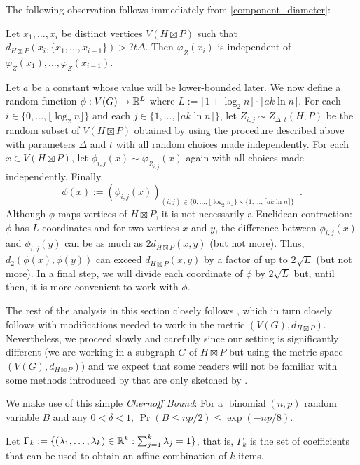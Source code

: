 \documentclass{patmorin}
\newcommand{\defin}[1]{\emph{\textcolor{brightmaroon}{#1}}}
\begin{document}
The following observation follows immediately from \cref{component_diameter}:
\begin{obs}\label{independent}
  Let $x_1,\ldots,x_i$ be distinct vertices $V(H\boxtimes P)$ such that $d_{H\boxtimes P}(x_i,\{x_1,\ldots,x_{i-1}\})> ?t\Delta$. Then $\varphi_Z(x_i)$ is independent of $\varphi_Z(x_1),\ldots,\varphi_Z(x_{i-1})$.
\end{obs}


Let $a$ be a constant whose value will be lower-bounded later.  We now define a random function $\phi:V(G)\to\mathbb{R}^{L}$ where $L:=\lfloor 1+\log_2 n\rfloor\cdot\lceil a k\ln n\rceil$. For each $i\in\{0,\ldots,\lfloor \log_2 n\rfloor\}$ and each $j\in\{1,\ldots,\lceil a k\ln n\rceil\}$, let $Z_{i,j}\sim Z_{\Delta,t}(H,P)$ be the random subset of $V(H\boxtimes P)$ obtained by using the procedure described above with parameters $\Delta$ and $t$ with all random choices made independently.  For each $x\in V(H\boxtimes P)$, let $\phi_{i,j}(x)\sim \varphi_{Z_{i,j}}(x)$ again with all choices made independently.  Finally,
\[
   \phi(x) := (\phi_{i,j}(x))_{(i,j)\in \{0,\ldots,\lfloor \log_2 n\rfloor\}\times\{1,\ldots,\lceil a k\ln n\rceil\}} \enspace .
\]
Although $\phi$ maps vertices of $H\boxtimes P$, it is not necessarily a Euclidean contraction: $\phi$ has $L$ coordinates and for two vertices $x$ and $y$, the difference between $\phi_{i,j}(x)$ and $\phi_{i,j}(y)$ can be as much as $2d_{H\boxtimes P}(x,y)$ (but not more).  Thus, $d_2(\phi(x),\phi(y))$ can exceed $d_{H\boxtimes P}(x,y)$ by a factor of up to $2\sqrt{L}$ (but not more).  In a final step, we will divide each coordinate of $\phi$ by $2\sqrt{L}$ but, until then, it is more convenient to work with $\phi$.

The rest of the analysis in this section closely follows \citet{rao:small}, which in turn closely follows \citet{feige:approximating} with modifications needed to work in the metric $(V(G),d_{H\boxtimes P})$.  Nevertheless, we proceed slowly and carefully since our setting is significantly different (we are working in a subgraph $G$ of $H\boxtimes P$ but using the metric space $(V(G),d_{H\boxtimes P})$) and we expect that some readers will not be familiar with some methods introduced by \citet{feige:approximating} that are only sketched by \citet{rao:small}.

We make use of this simple \defin{Chernoff Bound}: For a $\operatorname{binomial}(n,p)$ random variable $B$ and any $0<\delta<1$, $\Pr(B \le np/2) \le \exp(-np/8)$.

Let $\Gamma_k:=\{(\lambda_1,\ldots,\lambda_k)\in \mathbb{R}^k:\sum_{j=1}^k\lambda_j=1\}$, that is, $\Gamma_k$ is the set of coefficients that can be used to obtain an affine combination of $k$ items.
\end{document}
